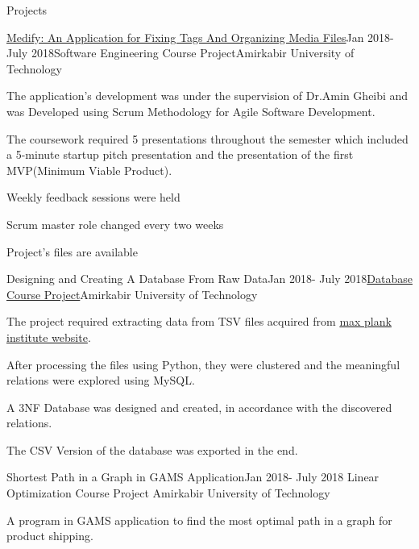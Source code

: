 \documentclass{resume} %
\begin{document}
	
	\begin{rSection}{Projects}
		
		\begin{rSubsection}{\href{https://github.com/pouyaaghahoseini/Medify}{Medify: An Application for Fixing Tags And Organizing Media Files}}{Jan 2018- July 2018}{Software Engineering Course Project}{Amirkabir University of Technology}
			
			\item The application's development was under the supervision of Dr.Amin Gheibi and was Developed using Scrum Methodology for Agile Software Development.
			\item The coursework required 5 presentations throughout the semester which included a 5-minute startup pitch presentation and the presentation of the first MVP(Minimum Viable Product).
			\item Weekly feedback sessions were held
			\item Scrum master role changed every two weeks
			\item Project's files are available 		
		\end{rSubsection}
		
		\begin{rSubsection}{Designing and Creating A Database From Raw Data}{Jan 2018- July 2018}{\href{https://github.com/pouyaaghahoseini/Database-Course}{Database Course Project}}{Amirkabir University of Technology}
			\item The project required extracting data from TSV files acquired from \href{https://www.mpi-inf.mpg.de/departments/databases-and-information-systems/research/yago-naga/yago/downloads/}{max plank institute website}.
			\item After processing the files using Python, they were clustered and the meaningful relations were explored using MySQL.
			\item A 3NF Database was designed and created, in accordance with the discovered relations.
			\item The CSV Version of the database was exported in the end. 
			
		\end{rSubsection}	
		
		
		\begin{rSubsection}{Shortest Path in a Graph in GAMS Application}{Jan 2018- July 2018}{
				Linear Optimization Course Project }{Amirkabir University of Technology}
			\item A program in GAMS application to find the most optimal path in a graph for product shipping.
			

\end{rSubsection}
\end{rSection}
\end{document}
